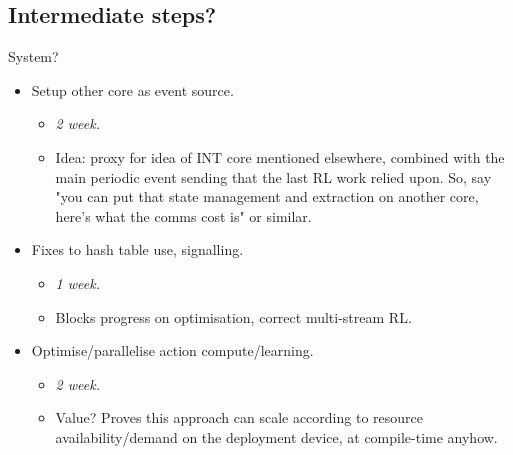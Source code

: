 \documentclass[sigconf,natbib=false]{acmart}
\begin{document}
\begin{appendices}
	\section{Intermediate steps?}
	System?
	\begin{itemize}
		\item Setup other core as event source.
		\begin{itemize}
			\item \emph{\num{2} week.}
			\item Idea: proxy for idea of INT core mentioned elsewhere, combined with the main periodic event sending that the last RL work relied upon. So, say "you can put that state management and extraction on another core, here's what the comms cost is" or similar.
		\end{itemize}
		\item Fixes to hash table use, signalling.
		\begin{itemize}
			\item \emph{\num{1} week.}
			\item Blocks progress on optimisation, correct multi-stream RL.
		\end{itemize}
		\item Optimise/parallelise action compute/learning.
		\begin{itemize}
			\item \emph{\num{2} week.}
			\item Value? Proves this approach can scale according to resource availability/demand on the deployment device, at compile-time anyhow.
		\end{itemize}
	\end{itemize}
	

\end{appendices}
\end{document}
